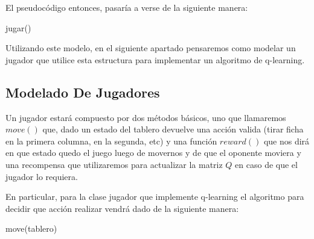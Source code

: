 El pseudocódigo entonces, pasaría a verse de la siguiente manera:
\pagebreak
\begin{algorithm}[h!]
\begin{algorithmic}[1]\parskip=1mm
 \caption{jugar()}
\end{algorithmic}
\end{algorithm}

Utilizando este modelo, en el siguiente apartado pensaremos como modelar un jugador que utilice esta estructura para implementar un algoritmo de q-learning.

\subsection{Modelado De Jugadores}

Un jugador estará compuesto por dos métodos básicos, uno que llamaremos $move()$ que, dado un estado del tablero devuelve una acción valida (tirar ficha en la primera columna, en la segunda, etc) y una función $reward()$ que nos dirá en que estado quedo el juego luego de movernos y de que el oponente moviera y una recompensa que utilizaremos para actualizar la matriz $Q$ en caso de que el jugador lo requiera.

En particular, para la clase jugador que implemente q-learning el algoritmo para decidir que acción realizar vendrá dado de la siguiente manera:

\begin{algorithm}[h!]
\begin{algorithmic}[1]\parskip=1mm
 \caption{move(tablero)}
\end{algorithmic}
\end{algorithm}

